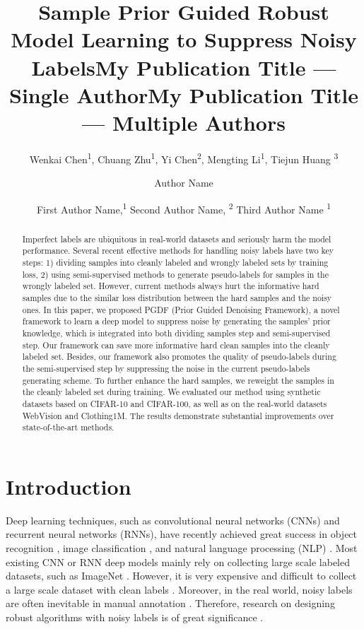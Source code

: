 \documentclass[letterpaper]{article} \usepackage{aaai22}  \usepackage{times}  \usepackage{helvet}  \usepackage{courier}  \usepackage[hyphens]{url}  \usepackage{graphicx} \urlstyle{rm} \def\UrlFont{\rm}  \usepackage{natbib}  \usepackage{caption} \DeclareCaptionStyle{ruled}{labelfont=normalfont,labelsep=colon,strut=off} \frenchspacing  \setlength{\pdfpagewidth}{8.5in}  \setlength{\pdfpageheight}{11in}  \usepackage{algorithm}
\title{Sample Prior Guided Robust Model Learning to Suppress Noisy Labels}
\author{
Wenkai Chen\textsuperscript{\rm 1}, 
    Chuang Zhu\textsuperscript{\rm 1}, 
    Yi Chen\textsuperscript{\rm 2}, 
    Mengting Li\textsuperscript{\rm 1}, 
    Tiejun Huang \textsuperscript{\rm 3}
}
\title{My Publication Title --- Single Author}
\author {
    Author Name
}
\title{My Publication Title --- Multiple Authors}
\author {
First Author Name,\textsuperscript{\rm 1}
    Second Author Name, \textsuperscript{\rm 2}
    Third Author Name \textsuperscript{\rm 1}
}
\begin{document}
\maketitle
\begin{abstract}
Imperfect labels are ubiquitous in real-world datasets and seriously harm the model performance. Several recent effective methods for handling noisy labels have two key steps: 1) dividing samples into cleanly labeled and wrongly labeled sets by training loss, 2) using semi-supervised methods to generate pseudo-labels for samples in the wrongly labeled set. However, current methods always hurt the informative hard samples due to the similar loss distribution between the hard samples and the noisy ones. In this paper, we proposed PGDF (Prior Guided Denoising Framework), a novel framework to learn a deep model to suppress noise by generating the samples' prior knowledge, which is integrated into both dividing samples step and semi-supervised step. Our framework can save more informative hard clean samples into the cleanly labeled set. Besides, our framework also promotes the quality of pseudo-labels during the semi-supervised step by suppressing the noise in the current pseudo-labels generating scheme. To further enhance the hard samples, we reweight the samples in the cleanly labeled set during training. We evaluated our method using synthetic datasets based on CIFAR-10 and CIFAR-100, as well as on the real-world datasets WebVision and Clothing1M. The results demonstrate substantial improvements over state-of-the-art methods.
\end{abstract}

\section{Introduction}
\label{Introduction}

Deep learning techniques, such as convolutional neural networks (CNNs) and recurrent neural networks (RNNs), have recently achieved great success in object recognition \cite{montserrat2017training}, image classification \cite{krizhevsky2012imagenet}, and natural language processing (NLP) \cite{young2018recent}. Most existing CNN or RNN deep models mainly rely on collecting large scale labeled datasets, such as ImageNet \cite{russakovsky2015imagenet}. However, it is very expensive and difficult to collect a large scale dataset with clean labels \cite{yi2019probabilistic}. Moreover, in the real world, noisy labels are often inevitable in manual annotation \cite{sun2019limited}. Therefore, research on designing robust algorithms with noisy labels is of great significance \cite{wei2019harnessing}.
\end{document}
